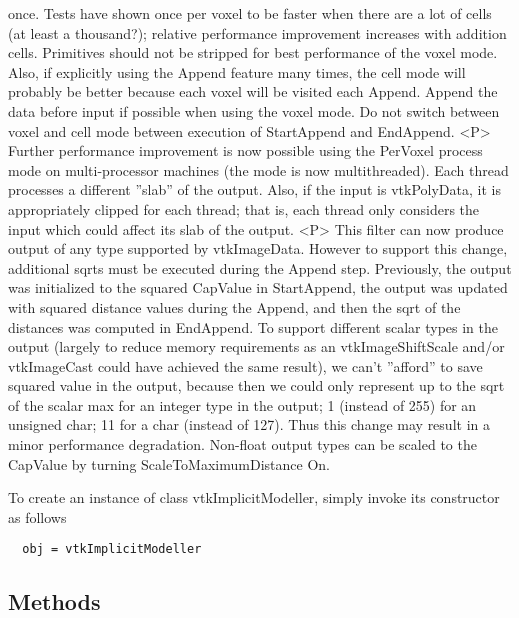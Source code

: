  once.  Tests have shown once per voxel to be faster when there are a 
 lot of cells (at least a thousand?); relative performance improvement 
 increases with addition cells. Primitives should not be stripped for best
 performance of the voxel mode.  Also, if explicitly using the Append feature
 many times, the cell mode will probably be better because each voxel will be
 visited each Append.  Append the data before input if possible when using
 the voxel mode.  Do not switch between voxel and cell mode between execution
 of StartAppend and EndAppend.
<P>
 Further performance improvement is now possible using the PerVoxel process
 mode on multi-processor machines (the mode is now multithreaded).  Each
 thread processes a different ''slab'' of the output.  Also, if the input is 
 vtkPolyData, it is appropriately clipped for each thread; that is, each 
 thread only considers the input which could affect its slab of the output.
<P>
 This filter can now produce output of any type supported by vtkImageData.  
 However to support this change, additional sqrts must be executed during the
 Append step.  Previously, the output was initialized to the squared CapValue 
 in StartAppend, the output was updated with squared distance values during 
 the Append, and then the sqrt of the distances was computed in EndAppend.  
 To support different scalar types in the output (largely to reduce memory 
 requirements as an vtkImageShiftScale and/or vtkImageCast could have 
 achieved the same result), we can't ''afford'' to save squared value in the
 output, because then we could only represent up to the sqrt of the scalar
 max for an integer type in the output; 1 (instead of 255) for an unsigned
 char; 11 for a char (instead of 127).  Thus this change may result in a
 minor performance degradation.  Non-float output types can be scaled to the
 CapValue by turning ScaleToMaximumDistance On.


To create an instance of class vtkImplicitModeller, simply
invoke its constructor as follows
\begin{verbatim}
  obj = vtkImplicitModeller
\end{verbatim}
\subsection{Methods}

